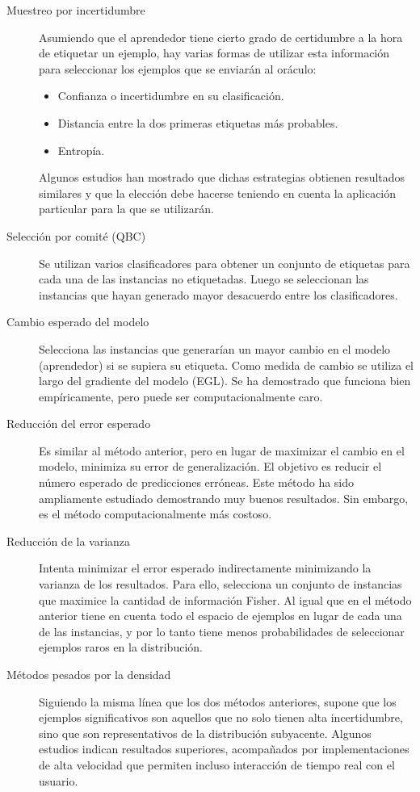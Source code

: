 \begin{description}
    \item[Muestreo por incertidumbre] Asumiendo que el aprendedor tiene cierto     grado de certidumbre a la hora de etiquetar un ejemplo, hay varias formas     de utilizar esta información para seleccionar los ejemplos que se enviarán     al oráculo:
    \begin{itemize}
        \item Confianza o incertidumbre en su clasificación.
        \item Distancia entre la dos primeras etiquetas más probables.
        \item Entropía.
    \end{itemize}
    Algunos estudios han mostrado que dichas estrategias obtienen resultados similares y que la elección debe hacerse teniendo en cuenta la aplicación particular para la que se utilizarán.
    \item[Selección por comité (QBC)] Se utilizan varios clasificadores para obtener
    un conjunto de etiquetas para cada una de las instancias no etiquetadas.
    Luego se seleccionan las instancias que hayan generado mayor desacuerdo
    entre los clasificadores.
    \item[Cambio esperado del modelo] Selecciona las instancias que generarían
    un mayor cambio en el modelo (aprendedor) si se supiera su etiqueta. Como
    medida de cambio se utiliza el largo del gradiente del modelo (EGL). Se ha
    demostrado que funciona bien empíricamente, pero puede ser
    computacionalmente caro.
    \item[Reducción del error esperado] Es similar al método anterior, pero en
    lugar de maximizar el cambio en el modelo, minimiza su error de
    generalización. El objetivo es reducir el número esperado de predicciones
    erróneas. Este método ha sido ampliamente estudiado demostrando muy buenos
    resultados. Sin embargo, es el método computacionalmente más costoso.
    \item[Reducción de la varianza] Intenta minimizar el error esperado indirectamente minimizando la varianza de los resultados. Para ello, selecciona un conjunto de instancias que maximice la cantidad de información Fisher. Al igual que en el método anterior tiene en cuenta todo el espacio de ejemplos en lugar de cada una de las instancias, y por lo tanto tiene menos probabilidades de seleccionar ejemplos raros en la distribución.
    \item[Métodos pesados por la densidad] Siguiendo la misma línea que los dos
    métodos anteriores, supone que los ejemplos significativos son aquellos
    que no solo tienen alta incertidumbre, sino que son representativos
    de la distribución subyacente. Algunos estudios indican resultados superiores,
    acompañados por implementaciones de alta velocidad que permiten incluso
    interacción de tiempo real con el usuario.
\end{description}

